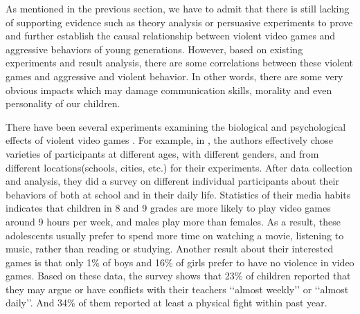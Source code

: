 \indent\indent As mentioned in the previous section, we have to admit that there is still lacking of supporting evidence such as theory analysis or persuasive experiments to prove and further establish the causal relationship between violent video games and aggressive behaviors of young generations. However, based on existing experiments and result analysis, there are some correlations between these violent games and aggressive and violent behavior. In other words, there are some very obvious impacts which may damage communication skills, morality and even personality of our children.

 There have been several experiments examining the biological and psychological effects of violent video games \cite{barlett2009, ferguson2008, gentile2004, anderson2003}. For example, in \cite{gentile2004}, the authors effectively chose varieties of participants at different ages, with different genders, and from different locations(schools, cities, etc.) for their experiments. After data collection and analysis, they did a survey on different individual participants about their behaviors of both at school and in their daily life. Statistics of their media habits indicates that children in 8 and 9 grades are more likely to play video games around 9 hours per week, and males play more than females. As a result, these adolescents usually prefer to spend more time on watching a movie, listening to music, rather than reading or studying. Another result about their interested games is that only 1\% of boys and 16\% of girls prefer to have no violence in video games. Based on these data, the survey shows that 23\% of children reported that they may argue or have conflicts with their teachers ‘‘almost weekly’’ or ‘‘almost daily’’. And 34\% of them reported at least a physical fight within past year. 
 
